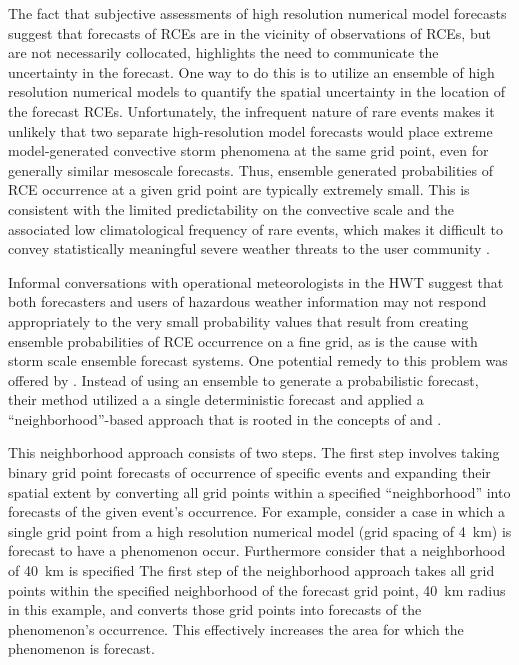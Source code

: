 The fact that subjective assessments of high resolution numerical model forecasts suggest that forecasts of RCEs are in the vicinity of observations of RCEs, but are not necessarily collocated, highlights the need to communicate the uncertainty in the forecast.
One way to do this is to utilize an ensemble of high resolution numerical models to quantify the spatial uncertainty in the location of the forecast RCEs.
Unfortunately, the infrequent nature of rare events makes it unlikely that two separate high-resolution model forecasts would place extreme model-generated convective storm phenomena at the same grid point, even for generally similar mesoscale forecasts.
Thus, ensemble generated probabilities of RCE occurrence at a given grid point are typically extremely small.
This is consistent with the limited predictability on the convective scale and the associated low climatological frequency of rare events, which makes it difficult to convey statistically meaningful severe weather threats to the user community \citep{Murphy1991}.


Informal conversations with operational meteorologists in the HWT suggest that both forecasters and users of hazardous weather information may not respond appropriately to the very small probability values that result from creating ensemble probabilities of RCE occurrence on a fine grid, as is the cause with storm scale ensemble forecast systems.
One potential remedy to this problem was offered by \cite{Sobash2011}.
Instead of using an ensemble to generate a probabilistic forecast, their method utilized a a single deterministic forecast and applied a ``neighborhood''-based approach that is rooted in the concepts of \cite{Theis2005} and \cite{Brooks1998}.


This neighborhood approach consists of two steps.
The first step involves taking binary grid point forecasts of occurrence of specific events and expanding their spatial extent by converting all grid points within a specified ``neighborhood'' into forecasts of the given event's occurrence.
For example, consider a case in which a single grid point from a high resolution numerical model (grid spacing of \mbox{4 km}) is forecast to have a phenomenon occur.
Furthermore consider that a neighborhood of \mbox{40 km} is specified
The first step of the neighborhood approach takes all grid points within the specified neighborhood of the forecast grid point, \mbox{40 km} radius in this example, and converts those grid points into forecasts of the phenomenon's occurrence.
This effectively increases the area for which the phenomenon is forecast.


